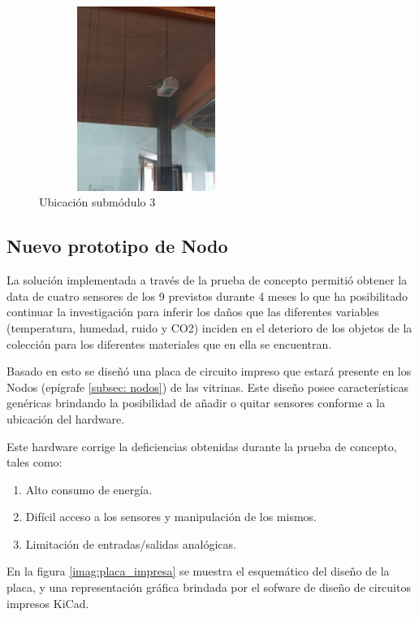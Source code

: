     \begin{figure}[H]
        \centering
        \includegraphics[width=7cm, height=6cm]{imagenes/submodulo 3.jpg}
        \caption{Ubicación submódulo 3}
        \label{imag:ubicacion_submodulo3}
    \end{figure}

    \subsection{Nuevo prototipo de Nodo} \label{subsec:nuevo_prototipo_nodo}

    La solución implementada a través de la prueba de concepto permitió obtener la data de cuatro sensores de los 9 previstos durante 4 meses lo que ha posibilitado continuar la investigación para inferir
    los daños que las diferentes variables (temperatura, humedad, ruido y CO2) inciden en el deterioro de los objetos de la colección para los diferentes materiales que en ella se encuentran.

    Basado en esto se diseñó una placa de circuito impreso que estará presente en los Nodos (epígrafe \ref{subsec: nodos}) de las vitrinas.
    Este diseño posee características genéricas brindando la posibilidad de añadir o quitar sensores conforme a la ubicación del hardware.

    \newpage

    Este hardware corrige la deficiencias obtenidas durante la prueba de concepto, tales como:
      \begin{enumerate}
        \item Alto consumo de energía.
        \item Difícil acceso a los sensores y manipulación de los mismos.
        \item Limitación de entradas/salidas analógicas.
      \end{enumerate}

    En la figura \ref{imag:placa_impresa} se muestra el esquemático del diseño de la placa, y una representación gráfica brindada por el sofware de diseño de circuitos impresos KiCad.

